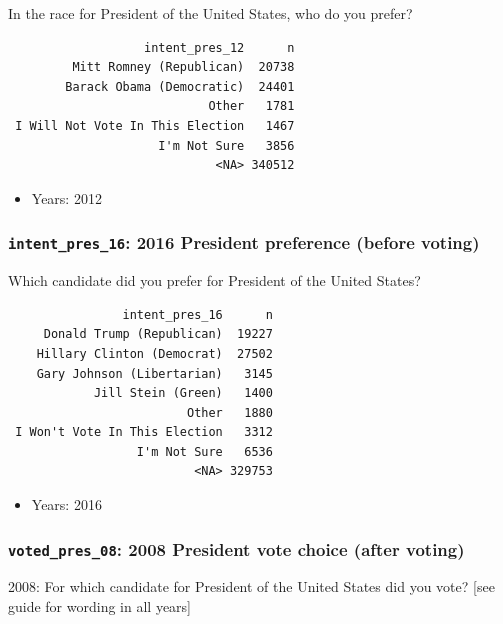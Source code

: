 \documentclass[10pt,article,oneside]{memoir}
\theoremstyle{definition}
\begin{document}
In the race for President of the United States, who do you prefer?

\begin{verbatim}
                   intent_pres_12      n
         Mitt Romney (Republican)  20738
        Barack Obama (Democratic)  24401
                            Other   1781
 I Will Not Vote In This Election   1467
                     I'm Not Sure   3856
                             <NA> 340512
\end{verbatim}

\begin{itemize}
\tightlist
\item
  Years: 2012
\end{itemize}

\subsubsection{\texorpdfstring{\texttt{intent\_pres\_16}: 2016 President
preference (before
voting)}{intent\_pres\_16: 2016 President preference (before voting)}}\label{intent_pres_16-2016-president-preference-before-voting}

Which candidate did you prefer for President of the United States?

\begin{verbatim}
                intent_pres_16      n
     Donald Trump (Republican)  19227
    Hillary Clinton (Democrat)  27502
    Gary Johnson (Libertarian)   3145
            Jill Stein (Green)   1400
                         Other   1880
 I Won't Vote In This Election   3312
                  I'm Not Sure   6536
                          <NA> 329753
\end{verbatim}

\begin{itemize}
\tightlist
\item
  Years: 2016
\end{itemize}

\subsubsection{\texorpdfstring{\texttt{voted\_pres\_08}: 2008 President
vote choice (after
voting)}{voted\_pres\_08: 2008 President vote choice (after voting)}}\label{voted_pres_08-2008-president-vote-choice-after-voting}

2008: For which candidate for President of the United States did you
vote? {[}see guide for wording in all years{]}
\end{document}
